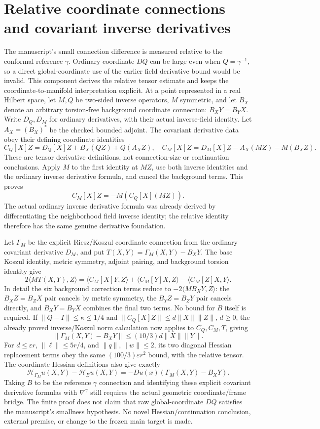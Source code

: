 \documentclass[11pt]{article}
\theoremstyle{definition}
\theoremstyle{remark}
\numberwithin{equation}{section}
\begin{document}
\section{Relative coordinate connections and covariant inverse derivatives}
\label{relative-connection:definitions}\label{relative-connection:inverse}\label{relative-connection:koszul}\label{relative-connection:norm}\label{relative-connection:hessian}
The manuscript's small connection difference is measured relative to the conformal reference $\gamma$. Ordinary coordinate $DQ$ can be large even when $Q=\gamma^{-1}$, so a direct global-coordinate use of the earlier field derivative bound would be invalid. This component derives the relative tensor estimate and keeps the coordinate-to-manifold interpretation explicit.
At a point represented in a real Hilbert space, let $M,Q$ be two-sided inverse operators, $M$ symmetric, and let $B_X$ denote an arbitrary torsion-free background coordinate connection: $B_XY=B_YX$. Write $D_Q,D_M$ for ordinary derivatives, with their actual inverse-field identity. Let $A_X=(B_X)^*$ be the checked bounded adjoint. The covariant derivative data obey their defining coordinate identities
\[
 C_Q[X]Z=D_Q[X]Z+B_X(QZ)+Q(A_XZ),
\quad C_M[X]Z=D_M[X]Z-A_X(MZ)-M(B_XZ).
\]
These are tensor derivative definitions, not connection-size or continuation conclusions. Apply $M$ to the first identity at $MZ$, use both inverse identities and the ordinary inverse derivative formula, and cancel the background terms. This proves
\[
 C_M[X]Z=-M(C_Q[X](MZ)).
\]
The actual ordinary inverse derivative formula was already derived by differentiating the neighborhood field inverse identity; the relative identity therefore has the same genuine derivative foundation.

Let $\Gamma_M$ be the explicit Riesz/Koszul coordinate connection from the ordinary covariant derivative $D_M$, and put $T(X,Y)=\Gamma_M(X,Y)-B_XY$.
The base Koszul identity, metric symmetry, adjoint pairing, and background torsion identity give
\[
 2\langle MT(X,Y),Z\rangle
 =\langle C_M[X]Y,Z\rangle+\langle C_M[Y]X,Z\rangle
  -\langle C_M[Z]X,Y\rangle.
\]
In detail the six background correction terms reduce to $-2\langle MB_XY,Z\rangle$: the $B_XZ=B_ZX$ pair cancels by metric symmetry, the $B_YZ=B_ZY$ pair cancels directly, and $B_XY=B_YX$ combines the final two terms. No bound for $B$ itself is required.
If $\|Q-I\|\le\kappa\le1/4$ and $\|C_Q[X]Z\|\le d\|X\|\|Z\|$, $d\ge0$, the already proved inverse/Koszul norm calculation now applies to $C_Q,C_M,T$, giving
\[
 \|\Gamma_M(X,Y)-B_XY\|\le(10/3)d\|X\|\|Y\|.
\]
For $d\le\varepsilon r$, $\|\ell\|\le5r/4$, and $\|q\|,\|w\|\le2$, its two diagonal Hessian replacement terms obey the same $(100/3)\varepsilon r^2$ bound, with the relative tensor.
The coordinate Hessian definitions also give exactly
\[
 \mathcal H_{\Gamma_M}u(X,Y)-\mathcal H_Bu(X,Y)
 =-Du(x)(\Gamma_M(X,Y)-B_XY).
\]
Taking $B$ to be the reference $\gamma$ connection and identifying these explicit covariant derivative formulas with $\nabla^\gamma$ still requires the actual geometric coordinate/frame bridge. The finite proof does not claim that raw global-coordinate $DQ$ satisfies the manuscript's smallness hypothesis. No novel Hessian/continuation conclusion, external premise, or change to the frozen main target is made.
\end{document}
